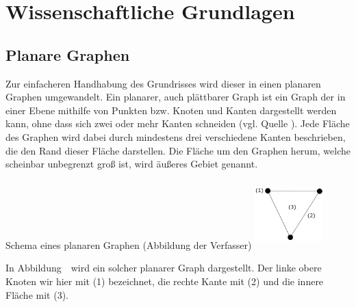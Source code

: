 \chapter{Wissenschaftliche Grundlagen}
\section{Planare Graphen}
Zur einfacheren Handhabung des Grundrisses wird dieser in einen planaren Graphen umgewandelt. 
Ein planarer, auch plättbarer Graph ist ein Graph der in einer Ebene mithilfe von Punkten bzw. Knoten und Kanten dargestellt werden kann, ohne dass sich zwei oder mehr Kanten schneiden (vgl. Quelle \cite{planarGraph}). 
Jede Fläche des Graphen wird dabei durch mindestens drei verschiedene Kanten beschrieben, die den Rand dieser Fläche darstellen. 
Die Fläche um den Graphen herum, welche scheinbar unbegrenzt groß ist, wird äußeres Gebiet genannt.
\begin{Bild}{Schema eines planaren Graphen (Abbildung der Verfasser)}
	\includegraphics[width = 100px, height = 100px]{Bilder/Graph_Scheme}
\end{Bild}
In Abbildung~\thebildnr\ wird ein solcher planarer Graph dargestellt.
Der linke obere Knoten wir hier mit (1) bezeichnet, die rechte Kante mit (2) und die innere Fläche mit (3).

